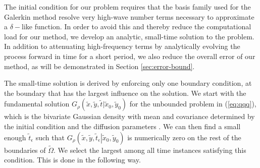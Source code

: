 The initial condition for our problem requires that the basis family
used for the Galerkin method resolve very high-wave number terms
necessary to approximate a $\delta-$like function. In order to avoid this
and thereby reduce the computational load for our method, we develop
an analytic, small-time solution to the problem. In addition to
attenuating high-frequency terms by analytically evolving the process
forward in time for a short period, we also reduce the overall error
of our method, as will be demonstrated in Section
\ref{sec:error-bound}.

The small-time solution is derived by enforcing only one boundary
condition, at the boundary that has the largest influence on the
solution. We start with the fundamental solution
$G_\rho(\tilde{x},\tilde{y},\tilde{t} | \tilde{x}_0, \tilde{y}_0)$ for
the unbounded problem in (\ref{eq:qqq}), which is the bivariate
Gaussian density with mean and covariance determined by the initial
condition and the diffusion parameters \cite{stakgold2011green}. We
can then find a small enough $\tilde{t}_\epsilon$ such that
$G_\rho\left(\tilde{x},\tilde{y}, \tilde{t}_\epsilon \left|
    \tilde{x}_0, \tilde{y}_0 \right.\right)$ is numerically zero on
the rest of the boundaries of $\tilde{\Omega}$. We select the largest
among all time instances satisfying this condition. This is done in
the following way.
